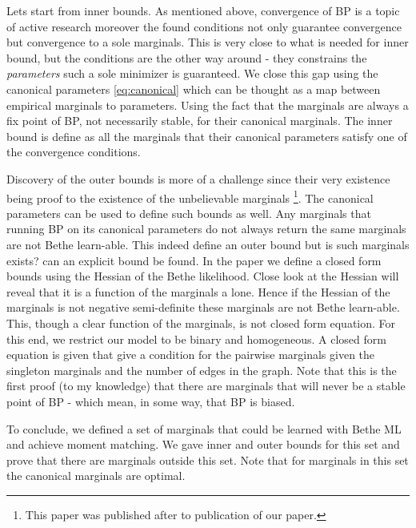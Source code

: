 {Lets start from inner bounds.
As mentioned above, convergence of BP is a topic of active research moreover the found conditions not only guarantee convergence but convergence to a sole marginals.
This is very close to what is needed for inner bound, but the conditions are the other way around - they constrains the \textit{parameters} such a sole minimizer is guaranteed.
We close this gap using the canonical parameters \eqref{eq:canonical} which can be thought as a map between empirical marginals to parameters.
Using the fact that the marginals are always a fix point of BP, not necessarily stable, for their canonical marginals.
The inner bound is define as all the marginals that their canonical parameters satisfy one of the convergence conditions.

Discovery of the outer bounds is more of a challenge since their very existence being proof to the existence of the unbelievable marginals \cite{pitkow2011learning}\footnote{This paper was published after to publication of our paper.}.
The canonical parameters can be used to define such bounds as well.
Any marginals that running BP on its canonical parameters do not always return the same marginals are not Bethe learn-able.
This indeed define an outer bound but is such marginals exists? can an explicit bound be found.
In the paper we define a closed form bounds using the Hessian of the Bethe likelihood.
Close look at the Hessian will reveal that it is a function of the marginals a lone.
Hence if the Hessian of the marginals is not negative semi-definite these marginals are not Bethe learn-able.
This, though a clear function of the marginals, is not closed form equation.
For this end, we restrict our model to be binary and homogeneous. 
A closed form equation is given that give a condition for the pairwise marginals given the singleton marginals and the number of edges in the graph.
Note that this is the first proof (to my knowledge) that there are marginals that will never be a stable point of BP - which mean, in some way, that BP is biased.

To conclude, we defined a set of marginals that could be learned with Bethe ML and achieve moment matching.
We gave inner and outer bounds for this set and prove that there are marginals outside this set.
Note that for marginals in this set the canonical marginals are optimal.  

}
